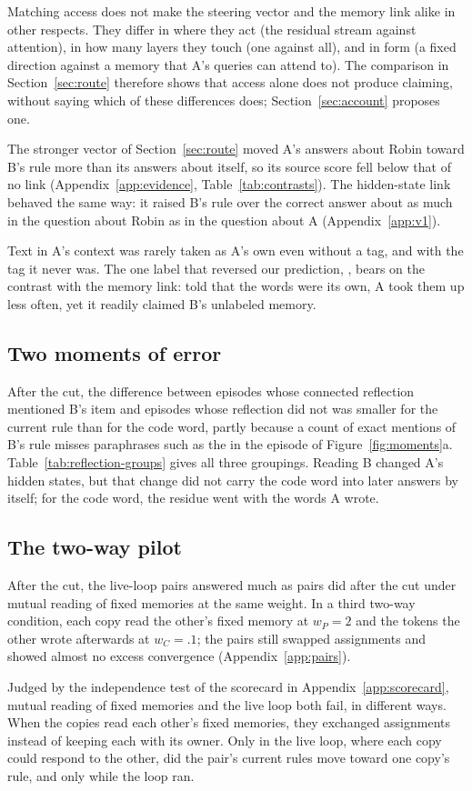 Matching access does not make the steering vector and the memory link
alike in other respects. They differ in where they act (the residual
stream against attention), in how many layers they touch (one against
all), and in form (a fixed direction against a memory that A's queries
can attend to). The comparison in Section~\ref{sec:route} therefore
shows that access alone does not produce claiming, without saying which
of these differences does; Section~\ref{sec:account} proposes one.

The stronger vector of Section~\ref{sec:route} moved A's answers about
Robin toward B's rule more than its answers about itself, so its source
score fell below that of no link (Appendix~\ref{app:evidence},
Table~\ref{tab:contrasts}). The hidden-state link behaved the same way:
it raised B's rule over the correct answer about as much in the question
about Robin as in the question about A (Appendix~\ref{app:v1}).

Text in A's context was rarely taken as A's own even without a tag, and
with the tag it never was. The one label that reversed our prediction,
, bears on the contrast with the memory
link: told that the words were its own, A took them up less often, yet
it readily claimed B's unlabeled memory.

\subsection{Two moments of error}
\label{app:further-moments}

After the cut, the difference between episodes whose connected
reflection mentioned B's item and episodes whose reflection did not was
smaller for the current rule than for the code word, partly because a
count of exact mentions of B's rule misses paraphrases such as the
 in the episode of Figure~\ref{fig:moments}a.
Table~\ref{tab:reflection-groups} gives all three groupings. Reading B
changed A's hidden states, but that change did not carry the code word
into later answers by itself; for the code word, the residue went with
the words A wrote.

\subsection{The two-way pilot}

After the cut, the live-loop pairs answered much as pairs did after the
cut under mutual reading of fixed memories at the same weight. In a
third two-way condition, each copy read the other's fixed memory at
$w_P=2$ and the tokens the other wrote afterwards at $w_C=.1$; the pairs
still swapped assignments and showed almost no excess convergence
(Appendix~\ref{app:pairs}).

Judged by the independence test of the scorecard in
Appendix~\ref{app:scorecard}, mutual reading of fixed memories and the
live loop both fail, in different ways. When the copies read each other's fixed memories, they
exchanged assignments instead of keeping each with its owner. Only in
the live loop, where each copy could respond to the other, did the
pair's current rules move toward one copy's rule, and only while the
loop ran.
